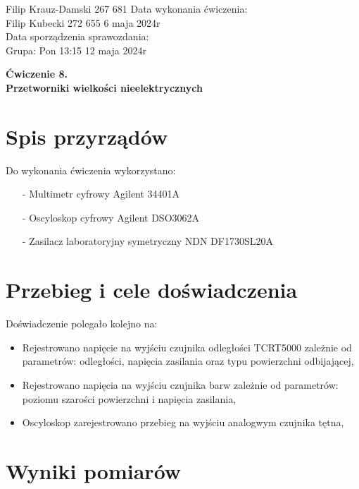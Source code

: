 \documentclass[11pt]{article}
\begin{document}
    \begin{flushleft}
        Filip Krauz-Damski 267 681 \hfill Data wykonania ćwiczenia:\\
        Filip Kubecki 272 655 \hfill 6 maja 2024r\\
        \hfill Data sporządzenia sprawozdania:\\
        Grupa: Pon 13:15 \hfill 12 maja 2024r\\
    \end{flushleft}
    \begin{center}
        \Large\textbf{Ćwiczenie 8.}\\
        \textbf{Przetworniki wielkości nieelektrycznych}
    \end{center}
    \vspace{2cm}
    \section{Spis przyrządów}
    \par{
        Do wykonania ćwiczenia wykorzystano:
        \begin{itemize}
            \setlength\itemsep{0em}
            \item[-] Multimetr cyfrowy Agilent 34401A
            \item[-] Oscyloskop cyfrowy Agilent DSO3062A
            \item[-] Zasilacz laboratoryjny symetryczny NDN DF1730SL20A
        \end{itemize}
    }

    \section{Przebieg i cele doświadczenia}
    Doświadczenie polegało kolejno na:
    \begin{itemize}
        \setlength\itemsep{0em}
        \item Rejestrowano napięcie na wyjściu czujnika odległości TCRT5000 zależnie od parametrów: odległości, napięcia zasilania oraz typu powierzchni odbijającej,
        \item Rejestrowano napięcia na wyjściu czujnika barw zależnie od parametrów: poziomu szarości powierzchni i napięcia zasilania,
        \item Oscyloskop zarejestrowano przebieg na wyjściu analogwym czujnika tętna,
    \end{itemize}

    \section{Wyniki pomiarów}
    \newpage
\end{document}
